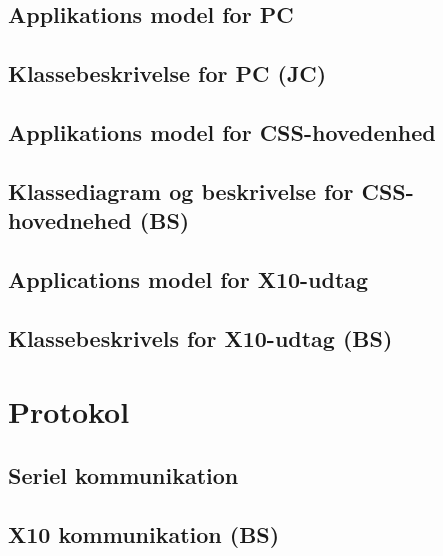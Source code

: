 \subsection{Applikations model for PC}

\clearpage

\subsection{Klassebeskrivelse for PC (JC)}

\newpage

\subsection{Applikations model for CSS-hovedenhed}

\clearpage

\subsection{Klassediagram og beskrivelse for CSS-hovednehed (BS)}

\newpage

\newpage
\subsection{Applications model for X10-udtag}

\clearpage

\subsection{Klassebeskrivels for X10-udtag (BS)}

\newpage

\section{Protokol}

\subsection{Seriel kommunikation}


\subsection{X10 kommunikation (BS)}

\newpage